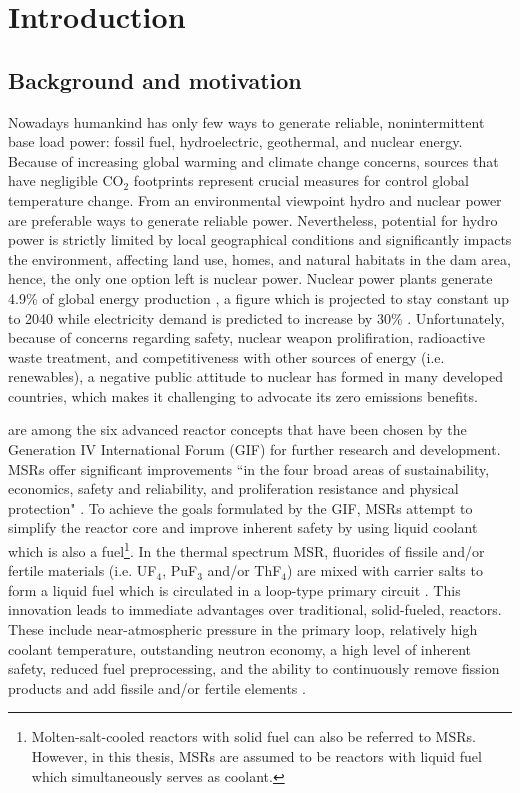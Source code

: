 \chapter[Introduction]{Introduction}

\section{Background and motivation}

Nowadays humankind has only few ways to generate reliable, nonintermittent base load power: fossil fuel, hydroelectric, geothermal, and nuclear energy. Because of increasing global warming and climate change concerns, sources that have negligible CO$_2$ footprints represent crucial measures for control global temperature change. From an environmental viewpoint hydro and nuclear power are preferable ways to generate reliable power. Nevertheless, potential for hydro power is strictly limited by local geographical conditions and significantly impacts the environment, affecting land use, homes, and natural habitats in the dam area, hence, the only one option left is nuclear power. Nuclear power plants generate 4.9\% of global energy production \cite{noauthor_key_2017}, a figure which is projected to stay constant up to 2040 while electricity demand is predicted to increase by 30\% \cite{noauthor_world_2017}. Unfortunately, because of concerns regarding safety, nuclear weapon prolifiration, radioactive waste treatment, and competitiveness with other sources of energy (i.e. renewables), a negative public attitude to nuclear has formed in many developed countries, which makes it challenging to advocate its zero emissions benefits.

 are among the six advanced reactor concepts that have been chosen by the Generation IV International Forum (GIF) for further research and development. \glspl{MSR} offer significant improvements ``in the four broad areas of sustainability, economics, safety and reliability, and proliferation resistance and physical protection" \cite{doe_technology_2002}. To achieve the goals formulated by the GIF, \glspl{MSR} attempt to simplify the reactor core and improve inherent safety by using liquid coolant which is also a fuel\footnote{Molten-salt-cooled reactors with solid fuel can also be referred to \glspl{MSR}. However, in this thesis, \glspl{MSR} are assumed to be reactors with liquid fuel which simultaneously serves as coolant.}. In the thermal spectrum \gls{MSR}, fluorides of fissile and/or fertile materials (i.e. UF$_4$, PuF$_3$ and/or ThF$_4$) are mixed with carrier salts to form a liquid fuel which is circulated in a loop-type primary circuit \cite{haubenreich_experience_1970}. This innovation leads to immediate advantages over traditional, solid-fueled, reactors. These include near-atmospheric pressure in the primary loop, relatively high coolant temperature, outstanding neutron economy, a high level of inherent safety, reduced fuel preprocessing, and the ability to continuously remove fission products and add fissile and/or fertile elements \cite{leblanc_molten_2010}. 

